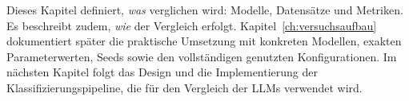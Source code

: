 Dieses Kapitel definiert, \emph{was} verglichen wird: Modelle, Datensätze und Metriken. Es beschreibt zudem, \emph{wie} der Vergleich erfolgt. Kapitel~\ref{ch:versuchsaufbau} dokumentiert später die praktische Umsetzung mit konkreten Modellen, exakten Parameterwerten, Seeds sowie den vollständigen genutzten Konfigurationen. Im nächsten Kapitel folgt das Design und die Implementierung der Klassifizierungspipeline, die für den Vergleich der \acp{LLM} verwendet wird.